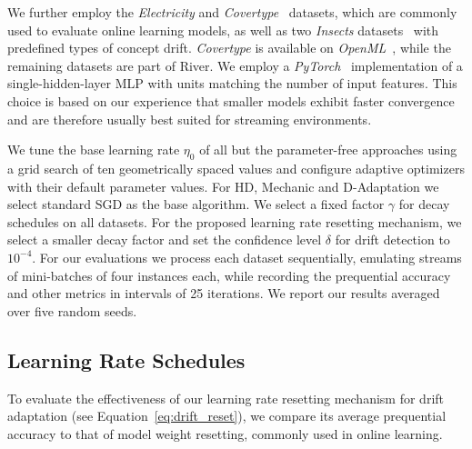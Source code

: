 \documentclass{article} %
\begin{document}

We further employ the \textit{Electricity} and \textit{Covertype}~\citep{misc_covertype_31} datasets, which are commonly used to evaluate online learning models, as well as two \textit{Insects} datasets~\citep{souzaChallengesBenchmarkingStream2020} with predefined types of concept drift.
\textit{Covertype} is available on \textit{OpenML}~\citep{vanschorenOpenMLNetworkedScience2014}, while the remaining datasets are part of River.
We employ a \textit{PyTorch}~\citep{paszkePyTorchImperativeStyle2019} implementation of a single-hidden-layer MLP with units matching the number of input features.
This choice is based on our experience that smaller models exhibit faster convergence and are therefore usually best suited for streaming environments.

We tune the base learning rate $\eta_0$ of all but the parameter-free approaches using a grid search of ten geometrically spaced values and configure adaptive optimizers with their default parameter values. For HD, Mechanic and D-Adaptation we select standard SGD as the base algorithm.
We select a fixed factor $\gamma$ for decay schedules on all datasets.
For the proposed learning rate resetting mechanism, we select a smaller decay factor and set the confidence level $\delta$ for drift detection to $10^{-4}$.
For our evaluations we process each dataset sequentially, emulating streams of mini-batches of four instances each, while recording the prequential accuracy and other metrics in intervals of 25 iterations.
We report our results averaged over five random seeds.

\subsection{Learning Rate Schedules}

To evaluate the effectiveness of our learning rate resetting mechanism for drift adaptation (see Equation~\eqref{eq:drift_reset}), we compare its average prequential accuracy to that of model weight resetting, commonly used in online learning.
\end{document}
